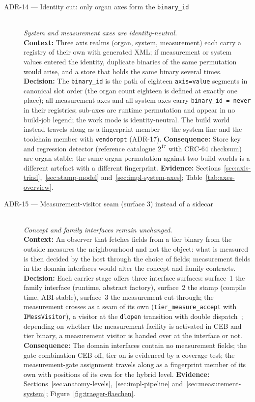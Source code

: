 \begin{description}
  \item[ADR-14 --- Identity cut: only organ axes form the \texttt{binary\_id}]\hfill\\
  \emph{System and measurement axes are identity-neutral.}\hfill\\
  \textbf{Context:} Three axis realms (organ, system, measurement) each carry a registry of their
  own with generated XML\@; if measurement or system values entered the identity, duplicate
  binaries of the same permutation would arise, and a store that holds the same binary several
  times.
  \textbf{Decision:} The \texttt{binary\_id} is the path of eighteen \texttt{axis=value} segments
  in canonical slot order (the organ count eighteen is defined at exactly one place); all
  measurement axes and all system axes carry \texttt{binary\_id = never} in their registries;
  sub-axes are runtime permutation and appear in no build-job legend; the work mode is
  identity-neutral. The build world instead travels along as a fingerprint member --- the system
  line and the toolchain member with \texttt{vendoropt} (ADR-17).
  \textbf{Consequence:} Store key and regression detector (reference catalogue $2^{17}$ with
  CRC-64 checksum) are organ-stable; the same organ permutation against two build worlds is a
  different artefact with a different fingerprint.
  \textbf{Evidence:} Sections~\ref{sec:axis-triad},~\ref{sec:stamp-model}
  and~\ref{sec:impl-system-axes}; Table~\ref{tab:axes-overview}.

  \item[ADR-15 --- Measurement-visitor seam (surface 3) instead of a sidecar]\hfill\\
  \emph{Concept and family interfaces remain unchanged.}\hfill\\
  \textbf{Context:} An observer that fetches fields from a tier binary from the outside measures
  the neighbourhood and not the object: what is measured is then decided by the host through the
  choice of fields; measurement fields in the domain interfaces would alter the concept and family
  contracts.
  \textbf{Decision:} Each carrier stage offers three interface surfaces: surface~1 the family
  interface (runtime, abstract factory), surface~2 the stamp (compile time, ABI-stable), surface~3
  the measurement cut-through; the measurement crosses as a seam of its own
  (\texttt{tier\_measure\_accept} with \texttt{IMessVisitor}), a visitor at the \texttt{dlopen}
  transition with double dispatch~\cite{gamma1994patterns}; depending on whether the measurement
  facility is activated in CEB and tier binary, a measurement visitor is handed over at the
  interface or not.
  \textbf{Consequence:} The domain interfaces contain no measurement fields; the gate combination
  CEB off, tier on is evidenced by a coverage test; the measurement-gate assignment travels along
  as a fingerprint member of its own with positions of its own for the hybrid level.
  \textbf{Evidence:} Sections~\ref{sec:anatomy-levels},~\ref{sec:impl-pipeline}
  and~\ref{sec:measurement-system}; Figure~\ref{fig:traeger-flaechen}.


\end{description}
